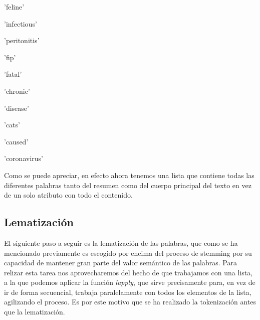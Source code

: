\documentclass[10pt, a4paper]{article}
\begin{document}
    
    \begin{enumerate*}
\item 'feline'
\item 'infectious'
\item 'peritonitis'
\item 'fip'
\item 'fatal'
\item 'chronic'
\item 'disease'
\item 'cats'
\item 'caused'
\item 'coronavirus'
\end{enumerate*}


Como se puede apreciar, en efecto ahora tenemos una lista que contiene todas las diferentes palabras tanto del resumen como del cuerpo principal del texto en vez de un solo atributo con todo el contenido.



\subsection{Lematización}

El siguiente paso a seguir es la lematización de las palabras, que como se ha mencionado previamente es escogido por encima del proceso de stemming por su capacidad de mantener gran parte del valor semántico de las palabras. Para relizar esta tarea nos aprovecharemos del hecho de que trabajamos con una lista, a la que podemos aplicar la función \textit{lapply}, que sirve precisamente para, en vez de ir de forma secuencial, trabaja paralelamente con todos los elementos de la lista, agilizando el proceso. Es por este motivo que se ha realizado la tokenización antes que la lematización. 
\end{document}
